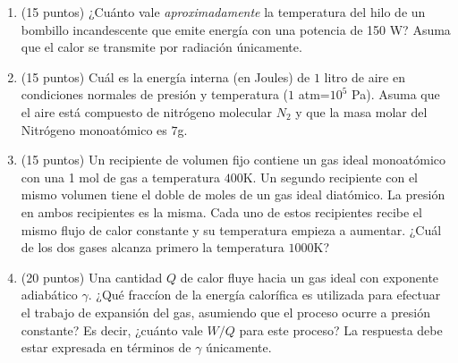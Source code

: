 \documentclass{article}
\begin{document}
\begin{enumerate}
\item (15 puntos) ¿Cuánto vale \emph{aproximadamente} la temperatura
  del hilo de un bombillo incandescente que emite energía con una
  potencia de 150 W? Asuma que el calor se transmite por radiación
  únicamente. 

\item (15 puntos)
Cu\'al es la energ\'ia interna (en Joules) de $1$ litro de aire en
condiciones normales de presi\'on y temperatura ($1$ atm=$10^5$ Pa).
Asuma que el aire est\'a compuesto de nitr\'ogeno molecular $N_2$ y
que la masa molar del Nitr\'ogeno monoat\'omico es $7$g.


\item (15 puntos) Un recipiente de volumen fijo contiene un gas ideal
  monoat\'omico con una 1 mol de gas a temperatura $400$K. Un segundo
  recipiente con el mismo volumen tiene el doble de moles de un gas
  ideal diat\'omico. La presi\'on en ambos recipientes es la
  misma. Cada uno de estos recipientes recibe el mismo flujo de calor
  constante y su temperatura empieza a aumentar. ¿Cu\'al de los dos
  gases alcanza primero la temperatura $1000$K?  



\item (20 puntos) Una cantidad $Q$ de calor fluye hacia un gas ideal con
  exponente adiab\'atico $\gamma$. ¿Qu\'e fracc\'ion de la energ\'ia
  calor\'ifica es utilizada para efectuar el trabajo de expansi\'on
  del gas, asumiendo que el proceso ocurre a presi\'on constante? Es
  decir, ¿cu\'anto vale $W/Q$ para este proceso? La respuesta debe
  estar expresada en t\'erminos de $\gamma$ \'unicamente. 

\end{enumerate}



\end{document}
